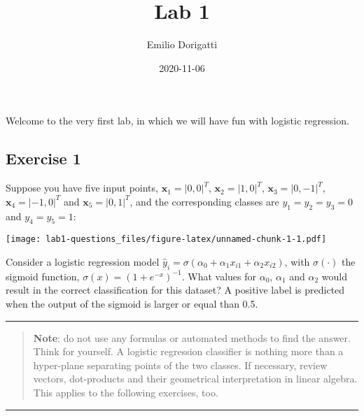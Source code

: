 \documentclass[
]{article}
\title{Lab 1}
\author{Emilio Dorigatti}
\date{2020-11-06}
\begin{document}
\maketitle

Welcome to the very first lab, in which we will have fun with logistic
regression.

\hypertarget{exercise-1}{%
\subsection{Exercise 1}\label{exercise-1}}

Suppose you have five input points, \(\textbf{x}_1=|0,0|^T\),
\(\textbf{x}_2=|1,0|^T\), \(\textbf{x}_3=|0,-1|^T\),
\(\textbf{x}_4=|-1,0|^T\) and \(\textbf{x}_5=|0,1|^T\), and the
corresponding classes are \(y_1=y_2=y_3=0\) and \(y_4=y_5=1\):

\texttt{[image: lab1-questions\_files/figure-latex/unnamed-chunk-1-1.pdf]}

Consider a logistic regression model
\(\hat{y}_i=\sigma\left(\alpha_0+\alpha_1x_{i1}+\alpha_2x_{i2}\right)\),
with \(\sigma(\cdot)\) the sigmoid function,
\(\sigma(x)=\left(1+e^{-x}\right)^{-1}\). What values for \(\alpha_0\),
\(\alpha_1\) and \(\alpha_2\) would result in the correct classification
for this dataset? A positive label is predicted when the output of the
sigmoid is larger or equal than 0.5.

\begin{center}\rule{0.5\linewidth}{0.5pt}\end{center}

\begin{quote}
\textbf{Note}: do not use any formulas or automated methods to find the
answer. Think for yourself. A logistic regression classifier is nothing
more than a hyper-plane separating points of the two classes. If
necessary, review vectors, dot-products and their geometrical
interpretation in linear algebra. This applies to the following
exercises, too.
\end{quote}

\begin{center}\rule{0.5\linewidth}{0.5pt}\end{center}
\end{document}
